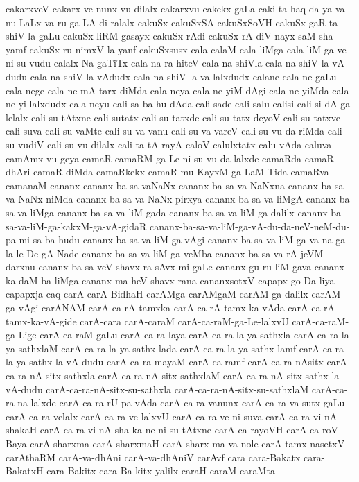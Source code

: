 {cakarxveV
cakarx-ve-nunx-vu-dilalx
cakarxvu
cakekx-gaLa
caki-ta-haq-da-ya-va-nu-LaLx-va-ru-ga-LA-di-ralalx
cakuSx
cakuSxSA
cakuSxSoVH
cakuSx-gaR-ta-shiV-la-gaLu
cakuSx-liRM-gasayx
cakuSx-rAdi
cakuSx-rA-diV-nayx-saM-sha-yamf
cakuSx-ru-nimxV-la-yanf
cakuSxsusx
cala
calaM
cala-liMga
cala-liM-ga-ve-ni-su-vudu
calalx-Na-gaTiTx
cala-na-ra-hiteV
cala-na-shiVla
cala-na-shiV-la-vA-dudu
cala-na-shiV-la-vAdudx
cala-na-shiV-la-va-lalxdudx
calane
cala-ne-gaLu
cala-nege
cala-ne-mA-tarx-diMda
cala-neya
cala-ne-yiM-dAgi
cala-ne-yiMda
cala-ne-yi-lalxdudx
cala-neyu
cali-sa-ba-hu-dAda
cali-sade
cali-salu
calisi
cali-si-dA-ga-lelalx
cali-su-tAtxne
cali-sutatx
cali-su-tatxde
cali-su-tatx-deyoV
cali-su-tatxve
cali-suva
cali-su-vaMte
cali-su-va-vanu
cali-su-va-vareV
cali-su-vu-da-riMda
cali-su-vudiV
cali-su-vu-dilalx
cali-ta-tA-rayA
caloV
calulxtatx
calu-vAda
caluva
camAmx-vu-geya
camaR
camaRM-ga-Le-ni-su-vu-da-lalxde
camaRda
camaR-dhAri
camaR-diMda
camaRkekx
camaR-mu-KayxM-ga-LaM-Tida
camaRva
camanaM
cananx
cananx-ba-sa-vaNaNx
cananx-ba-sa-va-NaNxna
cananx-ba-sa-va-NaNx-niMda
cananx-ba-sa-va-NaNx-pirxya
cananx-ba-sa-va-liMgA
cananx-ba-sa-va-liMga
cananx-ba-sa-va-liM-gada
cananx-ba-sa-va-liM-ga-dalilx
cananx-ba-sa-va-liM-ga-kakxM-ga-vA-gidaR
cananx-ba-sa-va-liM-ga-vA-du-da-neV-neM-du-pa-mi-sa-ba-hudu
cananx-ba-sa-va-liM-ga-vAgi
cananx-ba-sa-va-liM-ga-va-na-ga-la-le-De-gA-Nade
cananx-ba-sa-va-liM-ga-veMba
cananx-ba-sa-va-rA-jeVM-darxnu
cananx-ba-sa-veV-shavx-ra-sAvx-mi-gaLe
cananx-gu-ru-liM-gava
cananx-ka-daM-ba-liMga
cananx-ma-heV-shavx-rana
cananxsotxV
capapx-go-Da-liya
capapxja
caq
carA
carA-BidhaH
carAMga
carAMgaM
carAM-ga-dalilx
carAM-ga-vAgi
carANAM
carA-ca-rA-tamxka
carA-ca-rA-tamx-ka-vAda
carA-ca-rA-tamx-ka-vA-gide
carA-cara
carA-caraM
carA-ca-raM-ga-Le-lalxvU
carA-ca-raM-ga-Lige
carA-ca-raM-gaLu
carA-ca-ra-laya
carA-ca-ra-la-ya-sathxla
carA-ca-ra-la-ya-sathxlaM
carA-ca-ra-la-ya-sathx-lada
carA-ca-ra-la-ya-sathx-lamf
carA-ca-ra-la-ya-sathx-la-vA-dudu
carA-ca-ra-mayaM
carA-ca-ramf
carA-ca-ra-nAsitx
carA-ca-ra-nA-sitx-sathxla
carA-ca-ra-nA-sitx-sathxlaM
carA-ca-ra-nA-sitx-sathx-la-vA-dudu
carA-ca-ra-nA-sitx-su-sathxla
carA-ca-ra-nA-sitx-su-sathxlaM
carA-ca-ra-na-lalxde
carA-ca-ra-rU-pa-vAda
carA-ca-ra-vanunx
carA-ca-ra-va-sutx-gaLu
carA-ca-ra-velalx
carA-ca-ra-ve-lalxvU
carA-ca-ra-ve-ni-suva
carA-ca-ra-vi-nA-shakaH
carA-ca-ra-vi-nA-sha-ka-ne-ni-su-tAtxne
carA-ca-rayoVH
carA-ca-roV-Baya
carA-sharxma
carA-sharxmaH
carA-sharx-ma-va-nole
carA-tamx-nasetxV
carAthaRM
carA-va-dhAni
carA-va-dhAniV
carAvf
cara
cara-Bakatx
cara-BakatxH
cara-Bakitx
cara-Ba-kitx-yalilx
caraH
caraM
caraMta
}
